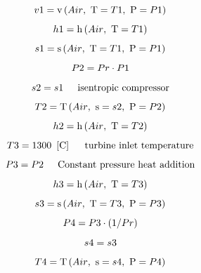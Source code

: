 \documentclass[10pt,fleqn]{article}
\newcommand{\F}[1]{\mbox{$#1$}}
\newcommand{\V}[1]{\mbox{$ #1 $}}
\newcommand{\I}{\mbox{\hspace{0.20in}}}
\newcommand{\temperature}{\mathrm{T}}
\newcommand{\volume}{\mathrm{v}}
\newcommand{\enthalpy}{\mathrm{h}}
\newcommand{\entropy}{\mathrm{s}}
\begin{document}
\begin{equation}
\label{EES Eqn:11}
\V{v1}  =\volume \left(\F{Air},\mbox{\ T}=\V{T1} ,\mbox{\ P}=\V{P1}  \right)  
\end{equation}
\begin{equation}
\label{EES Eqn:12}
\V{h1} =\enthalpy \left(\F{Air},\mbox{\ T}=\V{T1}  \right)  
\end{equation}
\begin{equation}
\label{EES Eqn:13}
\V{s1} =\entropy \left(\F{Air},\mbox{\ T}=\V{T1} ,\mbox{\ P}=\V{P1}  \right)  
\end{equation}
\begin{equation}
\label{EES Eqn:14}
\V{P2}  = \V{Pr} \cdot \V{P1}  
\end{equation}
\begin{equation}
\label{EES Eqn:15}
\V{s2}  = \V{s1}  
\mbox{\I isentropic compressor}
\end{equation}
\begin{equation}
\label{EES Eqn:16}
\V{T2} =\temperature \left(\F{Air},\mbox{\ s}=\V{s2} ,\mbox{\ P}=\V{P2}  \right)  
\end{equation}
\begin{equation}
\label{EES Eqn:17}
\V{h2} =\enthalpy \left(\F{Air},\mbox{\ T}=\V{T2}  \right)  
\end{equation}
\begin{equation}
\label{EES Eqn:18}
\V{T3}  = 1300   \   \left[ \rm C \right] 
\mbox{\I turbine inlet temperature}
\end{equation}
\begin{equation}
\label{EES Eqn:19}
\V{P3}  = \V{P2}  
\mbox{\I Constant pressure heat addition}
\end{equation}
\begin{equation}
\label{EES Eqn:20}
\V{h3} =\enthalpy \left(\F{Air},\mbox{\ T}=\V{T3}  \right)  
\end{equation}
\begin{equation}
\label{EES Eqn:21}
\V{s3} =\entropy \left(\F{Air},\mbox{\ T}=\V{T3} ,\mbox{\ P}=\V{P3}  \right)  
\end{equation}
\begin{equation}
\label{EES Eqn:22}
\V{P4}  = \V{P3} \cdot  \left( 1/\V{Pr} \right)  
\end{equation}
\begin{equation}
\label{EES Eqn:23}
\V{s4}  = \V{s3}  
\end{equation}
\begin{equation}
\label{EES Eqn:24}
\V{T4}  = \temperature \left(\F{Air},\mbox{\ s}=\V{s4} ,\mbox{\ P}=\V{P4}  \right)  
\end{equation}
\end{document}
